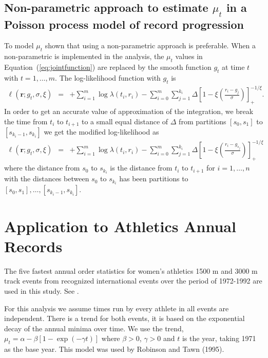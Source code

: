 \documentclass[10pt]{article}
\begin{document}
\subsection{Non-parametric approach to estimate $\mu_t$ in a
  Poisson process model of record progression}\label{NonparaPois}

To model $\mu_t$ \citet{Adam2007} shown that using a
non-parametric approach is preferable. When a non-parametric is
implemented in the analysis, the $\mu_t$ values in
Equation~(\ref{eq:jointfunction}) are replaced by the  
smooth function $g_t$ at time $t$ with $t=1,\ldots,m$. The
log-likelihood function with $g_t$ is  
\begin{align}
\ell(\pmb{r};g_t,\sigma,\xi) & = &  
 +     \sum^m_{i=1} \log \lambda(t_i,r_i) 
 -  \sum^m_{i=0}\sum^{k_i}_{j=1}\varDelta \left [
    1-\xi\left ( \frac{r_i
-g_j}{\sigma}\right) \right]^{-1/\xi}_+ .
\end{align}
In order to get an accurate value of approximation of the integration, we
break the time from $t_i$ to $t_{i+1}$ to a small equal distance of 
$\varDelta$ from partitions  $[s_0,s_1]$ to $[s_{k_i-1},s_{k_i}]$ we
get the modified log-likelihood as  
\begin{eqnarray}
\ell(\pmb{r};g_t,\sigma,\xi) & = &   
 +     \sum^m_{i=1} \log \lambda(t_i,r_i) 
 -  \sum^m_{i=0}\sum^{k_i}_{j=1}\varDelta \left [
    1-\xi\left ( \frac{r_i
-g_{s_j}}{\sigma}\right) \right]^{-1/\xi}_+ 
\label{loglike1}
\end{eqnarray}
where the distance from $s_0$ to $s_{k_i}$ is the distance from
$t_{i}$ to $t_{i+1}$ for $i = 1, \ldots, n$ with the distances between
$s_0$ to $s_{k_i}$ has been partitions to $[s_0,s_1] ,\ldots ,[s_{k_i -1}
,s_{k_i}]$. %



\section{Application to Athletics Annual Records}\label{SecAth}

The five fastest annual order statistics for women's athletics 1500 m and 
3000 m track events from recognized international events over the period of 
1972-1992 are used in this study. See \cite{rob}. 

For this analysis we assume times run by every athlete in all 
events are independent. There is a trend for both events, it  is based 
on the exponential decay of the annual minima over time.
We use the trend, $ \mu_t = \alpha - \beta[ 1- \exp(-\gamma t)]$ 
where $\beta > 0$, $\gamma >0$ and $t$ is the year, taking 1971 
as the base year. This model was used by Robinson and Tawn (1995).
\end{document}
